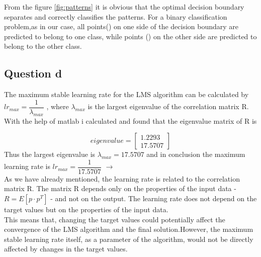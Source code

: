 From the figure \ref{fig:patterns} it is obvious that the optimal decision boundary separates and correctly classifies the patterns. For a binary classification problem,as in our case, all points(\color{red}{*}\color{black}) on one side of the decision boundary are predicted to belong to one class, while points (\color{blue}{x}\color{black}) on the other side are predicted to belong to the other class.\\

\subsection{Question d}
The maximum stable learning rate for the LMS algorithm can be calculated by
$lr_{max} = \dfrac{1}{\lambda_{max}}$ , where ${\lambda_{max}}$ is the largest eigenvalue of the correlation matrix R. With the help of matlab i calculated and found that the eigenvalue matrix of R is 

 \[
 eigenvalue = \left[
\begin{array}{c}  
	1.2293 \\
	17.5707  
\end{array}
\right]
\]
Thus the largest eigenvalue is ${\lambda_{max}} = 17.5707$ and in conclusion the maximum learning rate is $lr_{max} = \dfrac{1}{17.5707}$ $\rightarrow$ 
\\

As we have already mentioned, the learning rate is related to the correlation matrix R. The matrix R depends only on the properties of the input data -$R = E[p \cdot p^T]$ - and not on the output. The learning rate does not depend on the target values but on the properties of the input data.\\
This means that, changing the target values could potentially affect the convergence of the LMS algorithm and the final solution.However, the maximum stable learning rate itself, as a parameter of the algorithm, would not be directly affected by changes in the target values.\\

\vspace{2mm}

